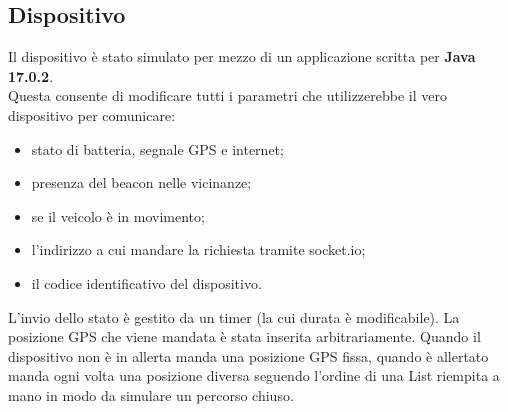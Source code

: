 \documentclass{report}
\begin{document}
\subsection{Dispositivo}
Il dispositivo è stato simulato per mezzo di un applicazione scritta per \textbf{Java 17.0.2}.\\
Questa consente di modificare tutti i parametri che utilizzerebbe il vero dispositivo per comunicare:
\begin{itemize}
    \item stato di batteria, segnale GPS e internet;
    \item presenza del beacon nelle vicinanze;
    \item se il veicolo è in movimento;
    \item l'indirizzo a cui mandare la richiesta tramite socket.io;
    \item il codice identificativo del dispositivo.
\end{itemize}
L'invio dello stato è gestito da un timer (la cui durata è modificabile). La posizione GPS che viene mandata è stata inserita arbitrariamente. Quando il dispositivo non è in allerta manda una posizione GPS fissa, quando è allertato manda ogni volta una posizione diversa seguendo l'ordine di una List riempita a mano in modo da simulare un percorso chiuso.
\end{document}
